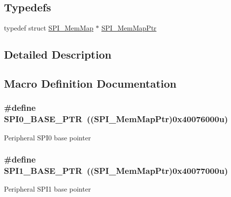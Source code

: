 \subsection*{Typedefs}
\begin{DoxyCompactItemize}
\item 
typedef struct \hyperlink{struct_s_p_i___mem_map}{S\+P\+I\+\_\+\+Mem\+Map} $\ast$ \hyperlink{group___s_p_i___peripheral_ga7e4e9921e4d56bdbb10a04e77743ff5e}{S\+P\+I\+\_\+\+Mem\+Map\+Ptr}
\end{DoxyCompactItemize}


\subsection{Detailed Description}


\subsection{Macro Definition Documentation}
\hypertarget{group___s_p_i___peripheral_ga851f64a97b5919c1f99a34db5918b3b4}{}
\subsubsection[{S\+P\+I0\+\_\+\+B\+A\+S\+E\+\_\+\+P\+T\+R}]{\setlength{\rightskip}{0pt plus 5cm}\#define S\+P\+I0\+\_\+\+B\+A\+S\+E\+\_\+\+P\+T\+R~(({\bf S\+P\+I\+\_\+\+Mem\+Map\+Ptr})0x40076000u)}\label{group___s_p_i___peripheral_ga851f64a97b5919c1f99a34db5918b3b4}
Peripheral S\+P\+I0 base pointer \hypertarget{group___s_p_i___peripheral_gae28fd789e0602a32076c1c13ca39f5af}{}
\subsubsection[{S\+P\+I1\+\_\+\+B\+A\+S\+E\+\_\+\+P\+T\+R}]{\setlength{\rightskip}{0pt plus 5cm}\#define S\+P\+I1\+\_\+\+B\+A\+S\+E\+\_\+\+P\+T\+R~(({\bf S\+P\+I\+\_\+\+Mem\+Map\+Ptr})0x40077000u)}\label{group___s_p_i___peripheral_gae28fd789e0602a32076c1c13ca39f5af}
Peripheral S\+P\+I1 base pointer \hypertarget{group___s_p_i___peripheral_ga3a16fecfe27c2052ab60e014be3f66f6}{}
